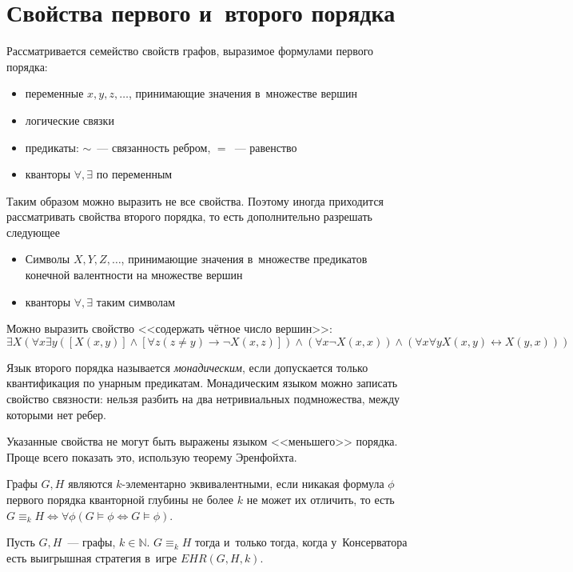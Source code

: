 \documentclass{article}
\begin{document}
\section{Свойства первого и~второго порядка}

Рассматривается семейство свойств графов, выразимое формулами первого порядка:
\begin{itemize}
	\item переменные $x, y, z, \ldots$, принимающие значения в~множестве вершин
	\item логические связки
	\item предикаты: $\sim$~--- связанность ребром, $=$~--- равенство
	\item кванторы $\forall, \exists$ по переменным
\end{itemize}

Таким образом можно выразить не все свойства. Поэтому иногда приходится рассматривать свойства
второго порядка, то есть дополнительно разрешать следующее
\begin{itemize}
	\item Символы $X, Y, Z, \ldots$, принимающие значения в~множестве предикатов конечной валентности
		на множестве вершин
	\item кванторы $\forall, \exists$ таким символам
\end{itemize}

Можно выразить свойство <<содержать чётное число вершин>>: $$\exists X \left( \forall x \exists y
\left( [X(x, y)] \land [\forall z (z \ne y) \rightarrow \neg X(x, z)] \right) \land (\forall x
\neg X(x, x)) \land (\forall x \forall y X(x, y) \leftrightarrow X(y, x)) \right)$$

Язык второго порядка называется \emph{монадическим}, если допускается только квантификация по
унарным предикатам. Монадическим языком можно записать свойство связности: нельзя разбить на два
нетривиальных подмножества, между которыми нет ребер.

Указанные свойства не могут быть выражены языком <<меньшего>> порядка. Проще всего показать это,
использую теорему Эренфойхта.

\begin{definition}
	Графы $G, H$ являются $k$-элементарно эквивалентными, если никакая формула $\phi$ первого порядка
	кванторной глубины не более $k$ не может их отличить, то есть $G \equiv_k H \Leftrightarrow
	\forall \phi (G \models \phi \Leftrightarrow G \models \phi)$.
\end{definition}

\begin{theorem}[Эренфойхт]
	Пусть $G, H$~--- графы, $k \in \mathbb{N}$. $G \equiv_k H$ тогда и~только тогда, когда
	у~Консерватора есть выигрышная стратегия в~игре $EHR(G, H, k)$.
\end{theorem}
\end{document}
